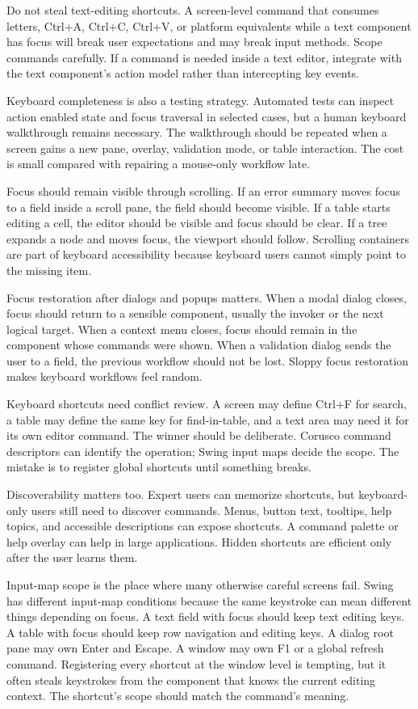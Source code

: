 Do not steal text-editing shortcuts. A screen-level command that consumes letters, Ctrl+A, Ctrl+C, Ctrl+V, or platform equivalents while a text component has focus will break user expectations and may break input methods. Scope commands carefully. If a command is needed inside a text editor, integrate with the text component's action model rather than intercepting key events.

Keyboard completeness is also a testing strategy. Automated tests can inspect action enabled state and focus traversal in selected cases, but a human keyboard walkthrough remains necessary. The walkthrough should be repeated when a screen gains a new pane, overlay, validation mode, or table interaction. The cost is small compared with repairing a mouse-only workflow late.

Focus should remain visible through scrolling. If an error summary moves focus to a field inside a scroll pane, the field should become visible. If a table starts editing a cell, the editor should be visible and focus should be clear. If a tree expands a node and moves focus, the viewport should follow. Scrolling containers are part of keyboard accessibility because keyboard users cannot simply point to the missing item.

Focus restoration after dialogs and popups matters. When a modal dialog closes, focus should return to a sensible component, usually the invoker or the next logical target. When a context menu closes, focus should remain in the component whose commands were shown. When a validation dialog sends the user to a field, the previous workflow should not be lost. Sloppy focus restoration makes keyboard workflows feel random.

Keyboard shortcuts need conflict review. A screen may define Ctrl+F for search, a table may define the same key for find-in-table, and a text area may need it for its own editor command. The winner should be deliberate. Corusco command descriptors can identify the operation; Swing input maps decide the scope. The mistake is to register global shortcuts until something breaks.

Discoverability matters too. Expert users can memorize shortcuts, but keyboard-only users still need to discover commands. Menus, button text, tooltips, help topics, and accessible descriptions can expose shortcuts. A command palette or help overlay can help in large applications. Hidden shortcuts are efficient only after the user learns them.

Input-map scope is the place where many otherwise careful screens fail. Swing
has different input-map conditions because the same keystroke can mean
different things depending on focus. A text field with focus should keep text
editing keys. A table with focus should keep row navigation and editing keys. A
dialog root pane may own Enter and Escape. A window may own F1 or a global
refresh command. Registering every shortcut at the window level is tempting,
but it often steals keystrokes from the component that knows the current editing
context. The shortcut's scope should match the command's meaning.

